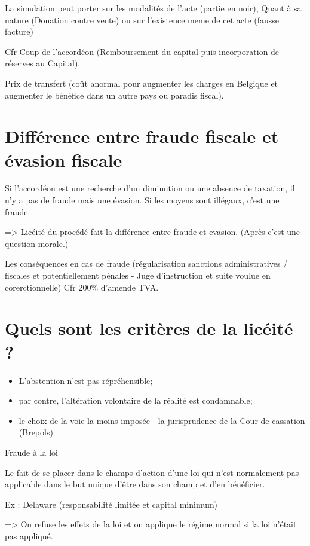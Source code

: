 \documentclass{book}
\begin{document}
   La simulation peut porter sur les modalités de l'acte (partie en noir), Quant à sa nature (Donation contre vente) ou sur l'existence meme de cet acte (fausse facture)
   
   Cfr Coup de l'accordéon (Remboursement du capital puis incorporation de réserves au Capital).
   
   Prix de transfert (coût anormal pour augmenter les charges en Belgique et augmenter le bénéfice dans un autre pays ou paradis fiscal).


\section{Différence entre fraude fiscale et évasion fiscale}

Si l'accordéon est une recherche d'un diminution ou une absence de taxation, il n'y a pas de fraude mais une évasion. Si les moyens sont illégaux, c'est une fraude.

=> Licéité du procédé fait la différence entre fraude et evasion. (Après c'est une question morale.)

Les conséquences en cas de fraude (régularisation sanctions administratives / fiscales et potentiellement pénales - Juge d'instruction et suite voulue en corerctionnelle) Cfr 200\% d'amende TVA. 

\section{Quels sont les critères de la licéité ?}

\begin{itemize}
\item L'abstention n'est pas répréhensible;
\item par contre, l'altération volontaire de la réalité est condamnable;
\item le choix de la voie la moins imposée - la jurisprudence de la Cour de cassation (Brepols)
\end{itemize}

Fraude à la loi

Le fait de se placer dans le champs d'action d'une loi qui n'est normalement pas applicable dans le but unique d'être dans son champ et d'en bénéficier.

Ex : Delaware (responsabilité limitée et capital minimum)

=> On refuse les effets de la loi et on applique le régime normal si la loi n'était pas appliqué.
\end{document}
